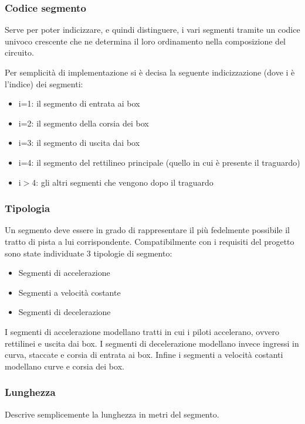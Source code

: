 \documentclass[a4paper,11pt, twoside, openright]{book}
\begin{document}
	\subsubsection{Codice segmento}
	  Serve per poter indicizzare, e quindi distinguere, i vari segmenti tramite un codice univoco 
	  crescente che ne determina il loro ordinamento
	  nella composizione del circuito. 

	  Per semplicità di implementazione si è decisa la seguente indicizzazione (dove i è l'indice) dei segmenti:
	  \begin{itemize}
	    \item i=1: il segmento di entrata ai box
	    \item i=2: il segmento della corsia dei box
	    \item i=3: il segmento di uscita dai box
	    \item i=4: il segmento del rettilineo principale (quello in cui è presente il traguardo)
	    \item i$>$4: gli altri segmenti che vengono dopo il traguardo
	  \end{itemize}
	  
	\subsubsection{Tipologia}
	  Un segmento deve essere in grado di rappresentare il più fedelmente possibile il tratto di pista
	  a lui corrispondente. Compatibilmente con i requisiti del progetto sono state individuate 3
	  tipologie di segmento:
	  
	  \begin{itemize}
	    \item Segmenti di accelerazione
	    \item Segmenti a velocità costante
	    \item Segmenti di decelerazione
	  \end{itemize}
	  
	  I segmenti di accelerazione modellano tratti in cui i piloti accelerano, ovvero rettilinei e uscita dai box. I segmenti di
	  decelerazione modellano invece ingressi in curva, staccate e corsia di entrata ai box. Infine
	  i segmenti a velocità costanti modellano curve e corsia dei box.
	  
	\subsubsection{Lunghezza}
	  Descrive semplicemente la lunghezza in metri del segmento.
	
\end{document}
